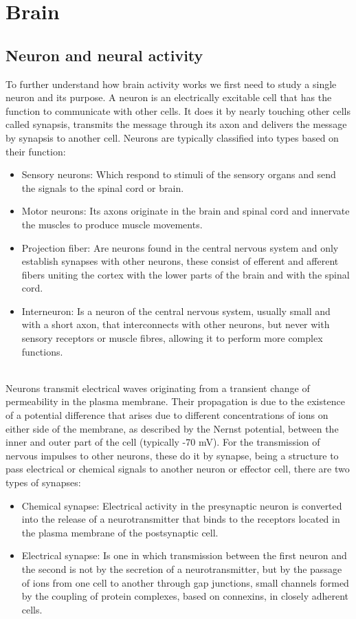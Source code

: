 ﻿\documentclass[10pt,a4paper,twocolumn,twoside]{article}
\begin{document}
\section{Brain}
\label{sec-brain}
\subsection{Neuron and neural activity}
\label{subsec-neuron}

To further understand how brain activity works we first need to study a single neuron and its purpose. A neuron is an electrically excitable cell that has the function to communicate with other cells. It does it by nearly touching other cells called synapsis, transmits the message through its axon and delivers the message by synapsis to another cell. Neurons are typically classified into types based on their function:
\\
\begin{itemize}
  \item Sensory neurons: Which respond to stimuli of the sensory organs and send the signals to the spinal cord or brain.
  \item Motor neurons: Its axons originate in the brain and spinal cord and innervate the muscles to produce muscle movements.
  \item Projection fiber: Are neurons found in the central nervous system and only establish synapses with other neurons, these consist of efferent and afferent fibers uniting the cortex with the lower parts of the brain and with the spinal cord.
  \item Interneuron: Is a neuron of the central nervous system, usually small and with a short axon, that interconnects with other neurons, but never with sensory receptors or muscle fibres, allowing it to perform more complex functions.
\end{itemize}
\leavevmode\\
Neurons transmit electrical waves originating from a transient change of permeability in the plasma membrane. Their propagation is due to the existence of a potential difference that arises due to different concentrations of ions on either side of the membrane, as described by the Nernst potential, between the inner and outer part of the cell (typically -70 mV). For the transmission of nervous impulses to other neurons, these do it by synapse, being a structure to pass electrical or chemical signals to another neuron or effector cell, there are two types of synapses:
\\
\begin{itemize}
  \item	Chemical synapse: Electrical activity in the presynaptic neuron is converted into the release of a neurotransmitter that binds to the receptors located in the plasma membrane of the postsynaptic cell.
  \item	Electrical synapse: Is one in which transmission between the first neuron and the second is not by the secretion of a neurotransmitter, but by the passage of ions from one cell to another through gap junctions, small channels formed by the coupling of protein complexes, based on connexins, in closely adherent cells.
\end{itemize}
\end{document}
